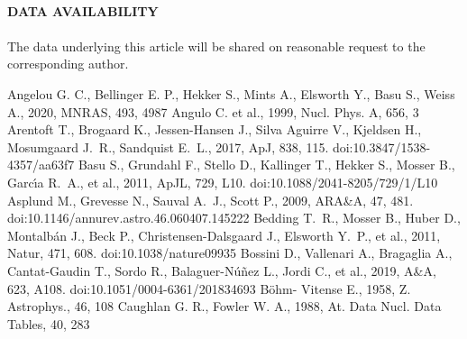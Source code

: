 \documentclass[a4paper,fleqn,usenatbib]{mnras}     %
\begin{document}
{~\\
{\uppercase{\bf{Data availability}}} \\
~\\
{The data underlying this article will be shared on reasonable request to the corresponding author.
} \\



%


\begin{thebibliography}{99}
 { Angelou G. C., Bellinger E. P., Hekker S., Mints A., Elsworth Y., Basu S., Weiss A., 2020, MNRAS, 493, 4987}
 Angulo C. et al., 1999, Nucl. Phys. A, 656, 3
 Arentoft T., Brogaard K., Jessen-Hansen J., Silva Aguirre V., Kjeldsen H., Mosumgaard J.~R., Sandquist E.~L., 2017, ApJ, 838, 115. doi:10.3847/1538-4357/aa63f7
 Basu S., Grundahl F., Stello D., Kallinger T., Hekker S., Mosser B., Garc{\'\i}a R.~A., et al., 2011, ApJL, 729, L10. doi:10.1088/2041-8205/729/1/L10
 Asplund M., Grevesse N., Sauval A.~J., Scott P., 2009, ARA\&A, 47, 481. doi:10.1146/annurev.astro.46.060407.145222
 Bedding T.~R., Mosser B., Huber D., Montalb{\'a}n J., Beck P., Christensen-Dalsgaard J., Elsworth Y.~P., et al., 2011, Natur, 471, 608. doi:10.1038/nature09935
 Bossini D., Vallenari A., Bragaglia A., Cantat-Gaudin T., Sordo R., Balaguer-N{\'u}{\~n}ez L., Jordi C., et al., 2019, A\&A, 623, A108. doi:10.1051/0004-6361/201834693
 B\"{o}hm- Vitense E., 1958, Z. Astrophys., 46, 108
 Caughlan G. R., Fowler W. A., 1988, At. Data Nucl. Data Tables, 40, 283

\end{thebibliography}}
\end{document}
